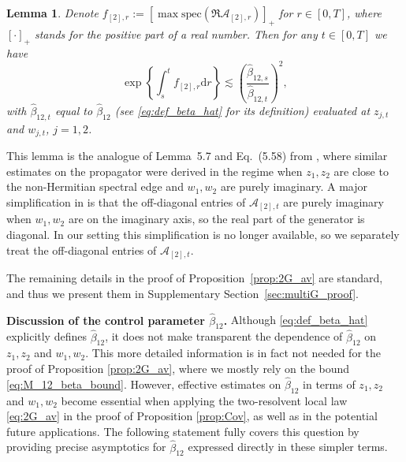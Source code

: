 \documentclass[10pt]{amsart}
\newtheorem{lemma}[theorem]{Lemma}
\numberwithin{equation}{section}
\newcommand{\dif}{\mathrm{d}}
\begin{document}
\begin{lemma}\label{lem:propag_bound2} Denote $f_{[2],r}:=\left[ \max \mathrm{spec}(\Re \mathcal{A}_{[2],r})\right]_+$ for $r\in [0,T]$, where $[\cdot]_+$ stands for the positive part of a real number. Then for any $t\in [0,T]$ we have
\begin{equation}
\exp\left\lbrace \int_s^t f_{[2],r}\dif r\right\rbrace \lesssim \left(\frac{\widehat{\beta}_{12,s}}{\widehat{\beta}_{12,t}}\right)^2,
\label{eq:propag_bound2}
\end{equation}
with $\widehat{\beta}_{12,t}$ equal to $\widehat{\beta}_{12}$ (see \eqref{eq:def_beta_hat} for its definition) evaluated at $z_{j,t}$ and $w_{j,t}$, $j=1,2$.
\end{lemma}

This lemma is the analogue of Lemma~5.7 and Eq.~(5.58) from \cite{univ_extr}, where similar estimates on the propagator were derived in the regime when $z_1,z_2$ are close to the non-Hermitian spectral edge and $w_1,w_2$ are purely imaginary. A major simplification in \cite{univ_extr} is that the off-diagonal entries of $\mathcal{A}_{[2],t}$ are purely imaginary when $w_1,w_2$ are on the imaginary axis, so the real part of the generator is diagonal. In our setting this simplification is no longer available, so we separately treat the off-diagonal entries of $\mathcal{A}_{[2],t}$.

The remaining details in the proof of Proposition~\ref{prop:2G_av} are standard, and thus we present them in Supplementary Section~\ref{sec:multiG_proof}.


\smallskip

\textbf{Discussion of the control parameter $\widehat{\beta}_{12}$.} Although \eqref{eq:def_beta_hat} explicitly defines $\widehat{\beta}_{12}$, it does not make transparent the dependence of $\widehat{\beta}_{12}$ on $z_1,z_2$ and $w_1,w_2$. This more detailed information is in fact not needed for the proof of Proposition \ref{prop:2G_av}, where we mostly rely on the bound \eqref{eq:M_12_beta_bound}. However, effective estimates on $\widehat{\beta}_{12}$ in terms of $z_1,z_2$ and $w_1,w_2$ become essential when applying the two-resolvent local law \eqref{eq:2G_av} in the proof of Proposition \ref{prop:Cov}, as well as in the potential future applications.  The following statement fully covers this question by providing precise asymptotics for $\widehat{\beta}_{12}$ expressed directly in these simpler terms.
\end{document}
